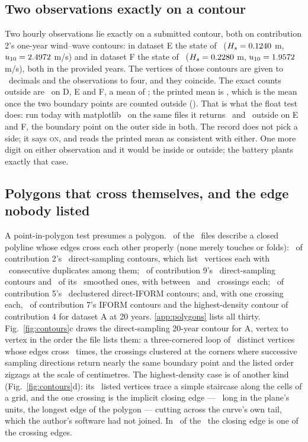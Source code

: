 \documentclass[preprint,11pt,authoryear]{elsarticle}
\begin{document}
\subsection{Two observations exactly on a contour}\label{sec:on}
Two hourly observations lie exactly on a submitted contour, both on contribution 2's one-year wind--wave contours: in dataset E the state of \EOnEWhen\ ($H_s = 0.1240$ m, $u_{10} = 2.4972$ m/s) and in dataset F the state of \EOnFWhen\ ($H_s = 0.2280$ m, $u_{10} = 1.9572$ m/s), both in the provided years. The vertices of those contours are given to \ETwoVertexDecimals\ decimals and the observations to four, and they coincide. The exact counts outside are \ETwoEach\ on D, E and F, a mean of \ETwoMean; the printed mean is \ETwoPrinted, which is the mean once the two boundary points are counted outside (\ETwoMeanWithOn). That is what the float test does: run today with matplotlib \EFloatMatplotlib\ on the same files it returns \EFloatOutE\ and \EFloatOutF\ outside on E and F, the boundary point on the outer side in both. The record does not pick a side; it says \textsc{on}, and reads the printed mean as consistent with either. One more digit on either observation and it would be inside or outside; the battery plants exactly that case.

\subsection{Polygons that cross themselves, and the edge nobody listed}\label{sec:polygons}
A point-in-polygon test presumes a polygon. \ENotSimple\ of the \EContours\ files describe a closed polyline whose edges cross each other properly (none merely touches or folds): \ENsTwo\ of contribution 2's \EFilesTwo\ direct-sampling contours, which list \ETwoVertices\ vertices each with \ETwoDuplicates\ consecutive duplicates among them; \ENsNineDS\ of contribution 9's \EFilesNineDS\ direct-sampling contours and \ENsNineDSs\ of its \EFilesNineDS\ smoothed ones, with between \ENsNineDSCrossMin\ and \ENsNineDSCrossMax\ crossings each; \ENsFive\ of contribution 5's \EFilesFive\ declustered direct-IFORM contours; and, with one crossing each, \ENsSeven\ of contribution 7's IFORM contours and the highest-density contour of contribution 4 for dataset A at 20 years. \ref{app:polygons} lists all thirty. Fig.~\ref{fig:contours}c draws the direct-sampling 20-year contour for A, vertex to vertex in the order the file lists them: a three-cornered loop of \EDSADistinct\ distinct vertices whose edges cross \EDSACross\ times, the crossings clustered at the corners where successive sampling directions return nearly the same boundary point and the listed order zigzags at the scale of centimetres. The highest-density case is of another kind (Fig.~\ref{fig:contours}d): its \EHDVertices\ listed vertices trace a simple staircase along the cells of a grid, and the one crossing is the implicit closing edge --- \EHDClosingLen\ long in the plane's units, the longest edge of the polygon --- cutting across the curve's own tail, which the author's software had not joined. In \EClosingCrossers\ of the \ENotSimple\ the closing edge is one of the crossing edges.
\end{document}
